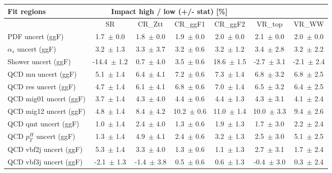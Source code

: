 \begin{tabular}{ l || c  c  c  c  c  c }
Fit regions & \multicolumn{4}{||c}{Impact high / low (+/- stat) [\%]} &  & \tabularnewline
\hline
 & SR & CR\_Ztt & CR\_ggF1 & CR\_ggF2 & VR\_top & VR\_WW\tabularnewline
\hline
PDF uncert (ggF) & 1.7\, $\pm$  0.0 & 1.8\, $\pm$  0.0 & 1.9\, $\pm$  0.0 & 2.0\, $\pm$  0.0 & 2.1\, $\pm$  0.0 & 2.0\, $\pm$  0.0\tabularnewline
$\alpha_s$ uncert (ggF) & 3.2\, $\pm$  1.3 & 3.3\, $\pm$  3.7 & 3.2\, $\pm$  0.6 & 3.2\, $\pm$  1.2 & 3.4\, $\pm$  2.8 & 3.2\, $\pm$  2.2\tabularnewline
Shower uncert (ggF) & -14.4\, $\pm$  1.2 & 0.7\, $\pm$  4.0 & 3.5\, $\pm$  0.6 & 18.6\, $\pm$  1.5 & -2.7\, $\pm$  3.1 & -2.1\, $\pm$  2.4\tabularnewline
QCD mu uncert (ggF) & 5.1\, $\pm$  1.4 & 6.4\, $\pm$  4.1 & 7.2\, $\pm$  0.6 & 7.3\, $\pm$  1.4 & 6.8\, $\pm$  3.2 & 6.8\, $\pm$  2.5\tabularnewline
QCD res uncert (ggF) & 4.7\, $\pm$  1.4 & 6.1\, $\pm$  4.1 & 6.8\, $\pm$  0.6 & 7.0\, $\pm$  1.4 & 6.5\, $\pm$  3.2 & 6.4\, $\pm$  2.5\tabularnewline
QCD mig01 uncert (ggF) & 3.7\, $\pm$  1.4 & 4.3\, $\pm$  4.0 & 4.4\, $\pm$  0.6 & 4.4\, $\pm$  1.3 & 4.3\, $\pm$  3.1 & 4.1\, $\pm$  2.4\tabularnewline
QCD mig12 uncert (ggF) & 4.8\, $\pm$  1.4 & 8.4\, $\pm$  4.2 & 10.2\, $\pm$  0.6 & 11.0\, $\pm$  1.4 & 10.0\, $\pm$  3.3 & 9.4\, $\pm$  2.6\tabularnewline
QCD qmt uncert (ggF) & 1.0\, $\pm$  1.4 & 2.4\, $\pm$  4.0 & 1.3\, $\pm$  0.6 & 1.9\, $\pm$  1.3 & 1.7\, $\pm$  3.0 & 2.2\, $\pm$  2.4\tabularnewline
QCD $p_T^H$ uncert (ggF) & 1.3\, $\pm$  1.4 & 4.9\, $\pm$  4.1 & 2.4\, $\pm$  0.6 & 3.2\, $\pm$  1.3 & 2.5\, $\pm$  3.0 & 5.1\, $\pm$  2.5\tabularnewline
QCD vbf2j uncert (ggF) & 5.3\, $\pm$  1.4 & 3.3\, $\pm$  4.0 & 1.3\, $\pm$  0.6 & 1.1\, $\pm$  1.3 & 2.7\, $\pm$  3.1 & 1.7\, $\pm$  2.4\tabularnewline
QCD vbf3j uncert (ggF) & -2.1\, $\pm$  1.3 & -1.4\, $\pm$  3.8 & 0.5\, $\pm$  0.6 & 0.6\, $\pm$  1.3 & -0.4\, $\pm$  3.0 & 0.3\, $\pm$  2.4
\end{tabular}